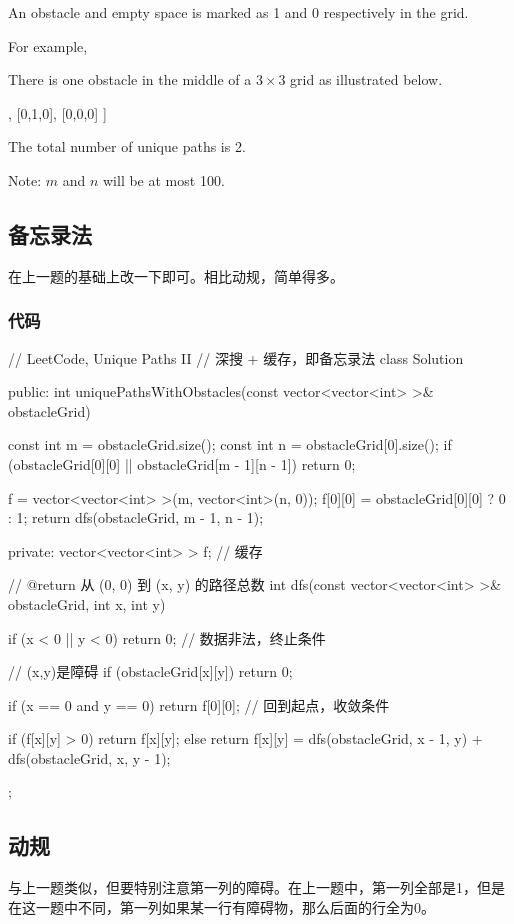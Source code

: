 An obstacle and empty space is marked as 1 and 0 respectively in the grid.

For example,

There is one obstacle in the middle of a $3 \times 3$ grid as illustrated below.
\begin{Code}
[
  [0,0,0],
  [0,1,0],
  [0,0,0]
]
\end{Code}

The total number of unique paths is 2.

Note: $m$ and $n$ will be at most 100.


\subsection{备忘录法}
在上一题的基础上改一下即可。相比动规，简单得多。

\subsubsection{代码}
\begin{Code}
// LeetCode, Unique Paths II
// 深搜 + 缓存，即备忘录法
class Solution {
public:
    int uniquePathsWithObstacles(const vector<vector<int> >& obstacleGrid) {
        const int m = obstacleGrid.size();
        const int n = obstacleGrid[0].size();
        if (obstacleGrid[0][0] || obstacleGrid[m - 1][n - 1]) return 0;

        f = vector<vector<int> >(m, vector<int>(n, 0));
        f[0][0] = obstacleGrid[0][0] ? 0 : 1;
        return dfs(obstacleGrid, m - 1, n - 1);
    }
private:
    vector<vector<int> > f;  // 缓存

    // @return 从 (0, 0) 到 (x, y) 的路径总数
    int dfs(const vector<vector<int> >& obstacleGrid,
            int x, int y) {
        if (x < 0 || y < 0) return 0; // 数据非法，终止条件

        // (x,y)是障碍
        if (obstacleGrid[x][y]) return 0;

        if (x == 0 and y == 0) return f[0][0]; // 回到起点，收敛条件

        if (f[x][y] > 0) {
            return f[x][y];
        } else {
            return f[x][y] = dfs(obstacleGrid, x - 1, y) + 
                dfs(obstacleGrid, x, y - 1);
        }
    }
};
\end{Code}


\subsection{动规}
与上一题类似，但要特别注意第一列的障碍。在上一题中，第一列全部是1，但是在这一题中不同，第一列如果某一行有障碍物，那么后面的行全为0。


